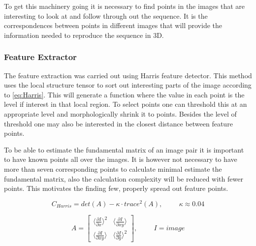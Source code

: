 To get this machinery going it is necessary to find points in the images that are interesting to look at and follow through out the sequence. It is the correspondences between points in different images that will provide the information needed to reproduce the sequence in 3D. 

\subsubsection{Feature Extractor}
The feature extraction was carried out using Harris feature detector. This method uses the local structure tensor to sort out interesting parts of the image according to \eqref{eq:Harris}. This will generate a function where the value in each point is the level if interest in that local region. To select points one can threshold this at an appropriate level and morphologically shrink it to points. Besides the level of threshold one may also be interested in the closest distance between feature points. 

To be able to estimate the fundamental matrix of an image pair it is important to have known points all over the images. It is however not necessary to have more than seven corresponding points to calculate minimal estimate the fundamental matrix, also the calculation complexity will be reduced with fewer points. This motivates the finding few, properly spread out feature points. 

\begin{equation}
\label{eq:Harris}
C_{Harris} = det(A) - \kappa \cdot trace^2(A), \hspace{1cm} \kappa \approx 0.04
\end{equation} 

\begin{equation}
\label{eq:StructureTensor}
A =  \begin{bmatrix}
	   \langle \frac{\partial I}{\partial x} \rangle^2 &  \langle \frac{\partial I}{\partial x y} \rangle \\
	   \langle \frac{\partial I}{\partial x y} \rangle & \langle \frac{\partial I}{\partial y} \rangle^2
	  \end{bmatrix}
	  , \hspace{1cm} I = image
\end{equation}

